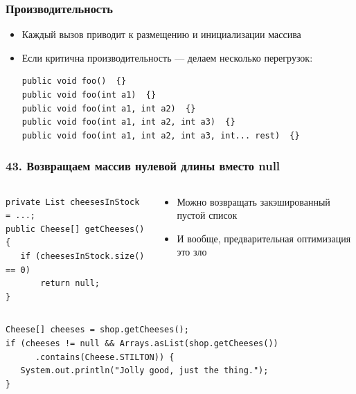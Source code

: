 \documentclass[xetex,mathserif,serif]{beamer}
\begin{document}
	\begin{frame}[fragile]
		\frametitle{Производительность}
		\begin{itemize}
			\item Каждый вызов приводит к размещению и инициализации массива
			\item Если критична производительность --- делаем несколько перегрузок:
				\begin{verbatim}
public void foo()  {}
public void foo(int a1)  {}
public void foo(int a1, int a2)  {}
public void foo(int a1, int a2, int a3)  {}
public void foo(int a1, int a2, int a3, int... rest)  {}
				\end{verbatim}
		\end{itemize}
	\end{frame}

	\begin{frame}[fragile]
		\frametitle{43. Возвращаем массив нулевой длины вместо null}
		\begin{columns}
			\begin{column}{0.5\textwidth}
				\begin{verbatim}
private List cheesesInStock = ...;
public Cheese[] getCheeses() {
   if (cheesesInStock.size() == 0)
       return null;
}
				\end{verbatim}
			\end{column}
			\begin{column}{0.5\textwidth}
				\begin{itemize}
					\item Можно возвращать закэшированный пустой список
					\item И вообще, предварительная оптимизация это зло
				\end{itemize}
			\end{column}
		\end{columns}
		\vspace{5mm}
		\begin{small}
			\begin{verbatim}
Cheese[] cheeses = shop.getCheeses();
if (cheeses != null && Arrays.asList(shop.getCheeses())
      .contains(Cheese.STILTON)) {
   System.out.println("Jolly good, just the thing.");
}
			\end{verbatim}
		\end{small}
	\end{frame}
\end{document}
